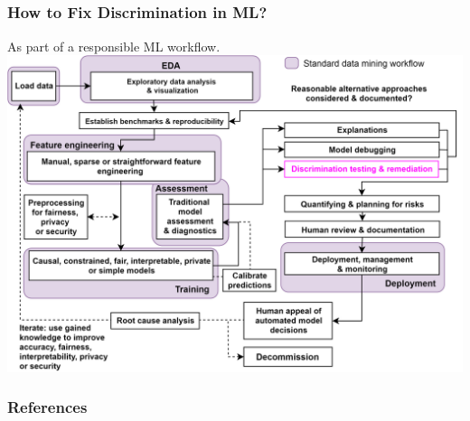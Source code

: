 \documentclass[11pt,
               		aspectratio=169,
               		hyperref={colorlinks}
               		]{beamer}
\begin{document}
		\subsection*{}
		\begin{frame}
			\frametitle{How to Fix Discrimination in ML?}		
			\centering
			As part of a responsible ML workflow.\\
			\vspace{10pt}
			{\includegraphics[scale=0.08]{img/blueprint.png}}
		\end{frame}
	\begin{frame}[t, allowframebreaks]
		\frametitle{References}
		\printbibliography
	\end{frame}
\end{document}
